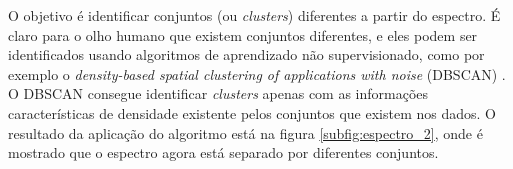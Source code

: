 \documentclass[a4paper,12pt,oneside]{book}
\begin{document}
\begin{appendices}

\par O objetivo é identificar conjuntos (ou \textit{clusters}) diferentes a partir do espectro. É claro para o olho humano que existem conjuntos diferentes, e eles podem ser identificados usando algoritmos de aprendizado não supervisionado, como por exemplo o \textit{density-based spatial clustering of applications with noise} (DBSCAN) \cite{dbscan}. O DBSCAN consegue identificar \textit{clusters} apenas com as informações características de densidade existente pelos conjuntos que existem nos dados. O resultado da aplicação do algoritmo está na figura \ref{subfig:espectro_2}, onde é mostrado que o espectro agora está separado por diferentes conjuntos.


\end{appendices}
\end{document}
